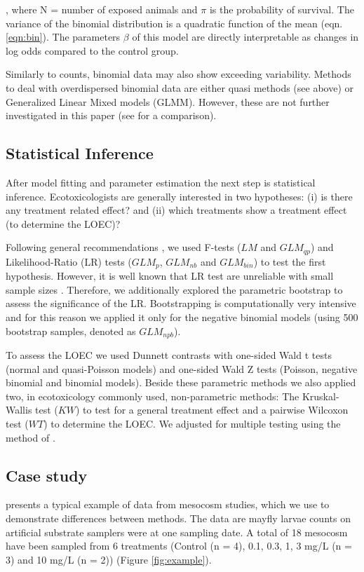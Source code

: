 \documentclass[twocolumn, natbib]{svjour3}
\begin{document}
, where N = number of exposed animals and $\pi$ is the probability of survival.
The variance of the binomial distribution is a quadratic function of the mean (eqn. \ref{eqn:bin}).
The parameters $\beta$ of this model are directly interpretable as changes in log odds compared to the control group.

Similarly to counts, binomial data may also show exceeding variability. 
Methods to deal with overdispersed binomial data are either quasi methods (see above) or Generalized Linear Mixed models (GLMM).
However, these are not further investigated in this paper (see \citet{warton_arcsine_2011} for a comparison).


\subsection{Statistical Inference}
After model fitting and parameter estimation the next step is statistical inference.
Ecotoxicologists are generally interested in two hypotheses: (i) is there any treatment related effect? and (ii) which treatments show a treatment effect (to determine the LOEC)?

Following general recommendations \citep{bolker_generalized_2009,faraway_extending_2006}, we used F-tests ($LM$ and $GLM_{qp}$) and Likeli\-hood-Ratio (LR) tests ($GLM_p$, $GLM_{nb}$ and $GLM_{bin}$) to test the first hypothesis.
However, it is well known that LR test are unreliable with small sample sizes \citep{wilks_large-sample_1938}.
Therefore, we additionally explored the parametric bootstrap \citep{faraway_extending_2006} to assess the significance of the LR.
Bootstrapping is computationally very intensive and for this reason we applied it only for the negative binomial models (using 500 bootstrap samples, denoted as $GLM_{npb}$).

To assess the LOEC we used Dunnett contrasts \citep{dunnett_multiple_1955} with one-sided Wald t tests (normal and quasi-Poisson models) and one-sided Wald Z tests (Poisson, negative binomial and binomial models).
Beside these parametric methods we also applied two, in ecotoxicology commonly used, non-parametric methods: The Kruskal-Wallis test  ($KW$) to test for a general treatment effect and a pairwise Wilcoxon test ($WT$) to determine the LOEC.
We adjusted for multiple testing using the method of \citet{holm_simple_1979}.



\subsection{Case study}
\citet{brock_minimum_2015} presents a typical example of data from mesocosm studies, which we use to demonstrate differences between methods.
The data are mayfly larvae counts on artificial substrate samplers were at one sampling date. 
A total of 18 mesocosm have been sampled from 6 treatments (Control (n = 4), 0.1, 0.3, 1, 3 mg/L (n = 3) and 10 mg/L (n = 2)) (Figure \ref{fig:example}).
\end{document}

